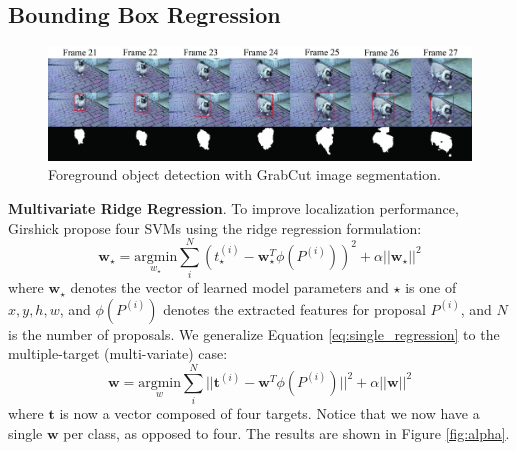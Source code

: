 \documentclass[10pt,twocolumn,letterpaper]{article}
\begin{document}
\subsection{Bounding Box Regression}

\begin{figure}[t]
	\includegraphics[width=\textwidth]{figures/cat_video.jpg}
	\caption{Foreground object detection with GrabCut image segmentation.}
	\label{fig:grabcut}
\end{figure}

	\textbf{Multivariate Ridge Regression}.	To improve localization performance, Girshick \etal propose four SVMs using the ridge regression formulation:
	\begin{equation}\label{eq:single_regression}
	\mathbf{w}_\star = \underset{w_\star}{\textrm{argmin}} \sum_{i}^{N} (t_\star^{(i)} - \mathbf{w}_\star^T \phi(P^{(i)}))^2 + \alpha || \mathbf{w}_\star ||^2
	\end{equation}
	where $\mathbf{w}_\star$ denotes the vector of learned model parameters and $\star$ is one of $x,y,h,w$, and $\phi(P^{(i)})$ denotes the extracted features for proposal $P^{(i)}$, and $N$ is the number of proposals.
	We generalize Equation \ref{eq:single_regression} to the multiple-target (\ie multi-variate) case:
	\begin{equation}\label{eq:multivariate_regression}
	\mathbf{w} = \underset{w}{\textrm{argmin}} \sum_{i}^{N} || \mathbf{t}^{(i)} - \mathbf{w}^T \phi(P^{(i)})||^2 + \alpha || \mathbf{w} ||^2
	\end{equation}
	where  $\mathbf{t}$ is now a vector composed of four targets. Notice that we now have a single $\mathbf{w}$ per class, as opposed to four. The results are shown in Figure \ref{fig:alpha}.
\end{document}
